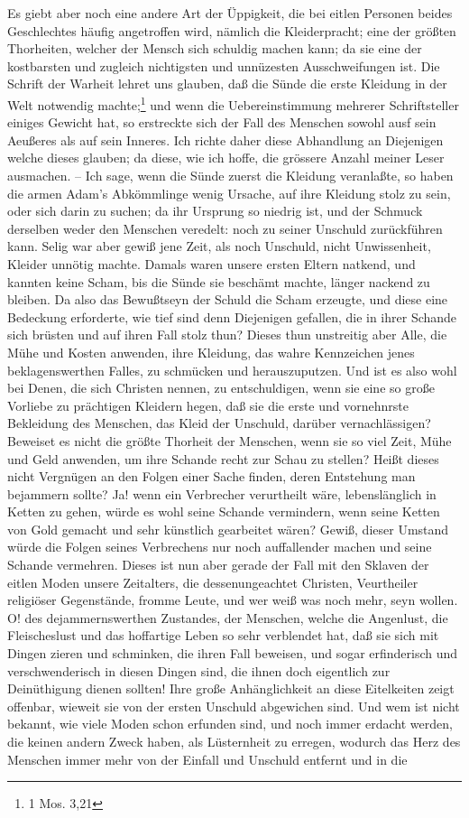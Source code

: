 Es giebt aber noch eine andere Art der Üppigkeit, die bei eitlen Personen beides Geschlechtes häufig angetroffen wird, nämlich die Kleiderpracht; eine der größten Thorheiten, welcher der Mensch sich schuldig machen kann; da sie eine der kostbarsten und zugleich nichtigsten und unnüzesten Ausschweifungen ist. Die Schrift der Warheit lehret uns glauben, daß die Sünde die erste Kleidung in der Welt notwendig machte;\footnote{1 Mos. 3,21} und wenn die Uebereinstimmung mehrerer Schriftsteller einiges Gewicht hat, so erstreckte sich der Fall des Menschen sowohl ausf sein Aeußeres als auf sein Inneres. Ich richte daher diese Abhandlung an Diejenigen welche dieses glauben; da diese, wie ich hoffe, die grössere Anzahl meiner Leser ausmachen. -- Ich sage, wenn die Sünde zuerst die Kleidung veranlaßte, so haben die armen Adam’s Abkömmlinge wenig Ursache, auf ihre Kleidung stolz zu sein, oder sich darin zu suchen; da ihr Ursprung so niedrig ist, und der Schmuck derselben weder den Menschen veredelt: noch zu seiner Unschuld zurückführen kann. Selig war aber gewiß jene Zeit, als noch Unschuld, nicht Unwissenheit, Kleider unnötig machte. Damals waren unsere ersten Eltern natkend, und kannten keine Scham, bis die Sünde sie beschämt machte, länger nackend zu bleiben. Da also das Bewußtseyn der Schuld die Scham erzeugte, und diese eine Bedeckung erforderte, wie tief sind denn Diejenigen gefallen, die in ihrer Schande sich brüsten und auf ihren Fall stolz thun? Dieses thun unstreitig aber Alle, die Mühe und Kosten anwenden, ihre Kleidung, das wahre Kennzeichen jenes beklagenswerthen Falles, zu schmücken und herauszuputzen. Und ist es also wohl bei Denen, die sich Christen nennen, zu entschuldigen, wenn sie eine so große Vorliebe zu prächtigen Kleidern hegen, daß sie die erste und vornehnrste Bekleidung des Menschen, das Kleid der Unschuld, darüber vernachlässigen? Beweiset es nicht die größte Thorheit der Menschen, wenn sie so viel Zeit, Mühe und Geld anwenden, um ihre Schande recht zur Schau zu stellen? Heißt dieses nicht Vergnügen an den Folgen einer Sache finden, deren Entstehung man bejammern sollte? Ja! wenn ein Verbrecher verurtheilt wäre, lebenslänglich in Ketten zu gehen, würde es wohl seine Schande vermindern, wenn seine Ketten von Gold gemacht und sehr künstlich gearbeitet wären? Gewiß, dieser Umstand würde die Folgen seines Verbrechens nur noch auffallender machen und seine Schande vermehren. Dieses ist nun aber gerade der Fall mit den Sklaven der eitlen Moden unsere Zeitalters, die dessenungeachtet Christen, Veurtheiler religiöser Gegenstände, fromme Leute, und wer weiß was noch mehr, seyn wollen. O! des dejammernswerthen Zustandes, der Menschen, welche die Angenlust, die Fleischeslust und das hoffartige Leben so sehr verblendet hat, daß sie sich mit Dingen zieren und schminken, die ihren Fall beweisen, und sogar erfinderisch und verschwenderisch in diesen Dingen sind, die ihnen doch eigentlich zur Deinüthigung dienen sollten! Ihre große Anhänglichkeit an diese Eitelkeiten zeigt offenbar, wieweit sie von der ersten Unschuld abgewichen sind. Und wem ist nicht bekannt, wie viele Moden schon erfunden sind, und noch immer erdacht werden, die keinen andern Zweck haben, als Lüsternheit zu erregen, wodurch das Herz des Menschen immer mehr von der Einfall und Unschuld entfernt und in die 